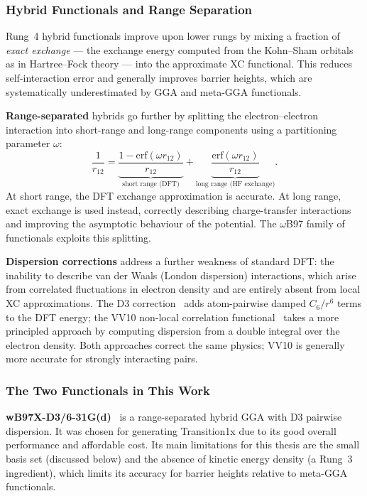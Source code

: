 \subsubsection{Hybrid Functionals and Range Separation}

Rung~4 hybrid functionals improve upon lower rungs by mixing a fraction of
\emph{exact exchange} --- the exchange energy computed from the Kohn--Sham
orbitals as in Hartree--Fock theory --- into the approximate XC functional.
This reduces self-interaction error and generally improves barrier heights, which
are systematically underestimated by GGA and meta-GGA functionals.

\textbf{Range-separated} hybrids go further by splitting the electron--electron
interaction into short-range and long-range components using a partitioning
parameter $\omega$:
%
\begin{equation}
  \frac{1}{r_{12}} = \underbrace{\frac{1-\text{erf}(\omega r_{12})}{r_{12}}}_{\text{short range (DFT)}}
  + \underbrace{\frac{\text{erf}(\omega r_{12})}{r_{12}}}_{\text{long range (HF exchange)}}.
\end{equation}
%
At short range, the DFT exchange approximation is accurate. At long range, exact
exchange is used instead, correctly describing charge-transfer interactions and
improving the asymptotic behaviour of the potential. The $\omega$B97 family of
functionals exploits this splitting.

\textbf{Dispersion corrections} address a further weakness of standard DFT: the
inability to describe van der Waals (London dispersion) interactions, which arise
from correlated fluctuations in electron density and are entirely absent from local
XC approximations. The D3 correction~\cite{grimme2010} adds atom-pairwise damped
$C_6/r^6$ terms to the DFT energy; the VV10 non-local correlation
functional~\cite{vydrov2010} takes a more principled approach by computing
dispersion from a double integral over the electron density. Both approaches
correct the same physics; VV10 is generally more accurate for strongly interacting
pairs.

\subsubsection{The Two Functionals in This Work}

\textbf{\mbox{wB97X-D3/6-31G(d)}}~\cite{lin2013} is a range-separated hybrid
GGA with D3 pairwise dispersion. It was chosen for generating Transition1x due to
its good overall performance and affordable cost. Its main limitations for this
thesis are the small basis set (discussed below) and the absence of kinetic energy
density (a Rung~3 ingredient), which limits its accuracy for barrier heights
relative to meta-GGA functionals.


